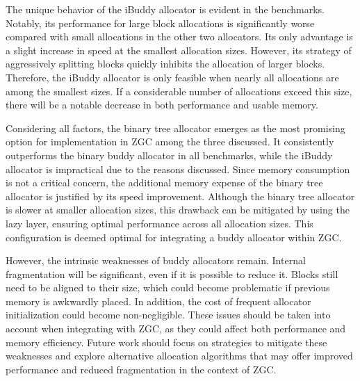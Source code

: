 \newpage
The unique behavior of the iBuddy allocator is evident in the benchmarks. Notably, its performance for large block allocations is significantly worse compared with small allocations in the other two allocators. Its only advantage is a slight increase in speed at the smallest allocation sizes. However, its strategy of aggressively splitting blocks quickly inhibits the allocation of larger blocks. Therefore, the iBuddy allocator is only feasible when nearly all allocations are among the smallest sizes. If a considerable number of allocations exceed this size, there will be a notable decrease in both performance and usable memory.

Considering all factors, the binary tree allocator emerges as the most promising option for implementation in ZGC among the three discussed. It consistently outperforms the binary buddy allocator in all benchmarks, while the iBuddy allocator is impractical due to the reasons discussed. Since memory consumption is not a critical concern, the additional memory expense of the binary tree allocator is justified by its speed improvement. Although the binary tree allocator is slower at smaller allocation sizes, this drawback can be mitigated by using the lazy layer, ensuring optimal performance across all allocation sizes. This configuration is deemed optimal for integrating a buddy allocator within ZGC.

However, the intrinsic weaknesses of buddy allocators remain. Internal fragmentation will be significant, even if it is possible to reduce it. Blocks still need to be aligned to their size, which could become problematic if previous memory is awkwardly placed. In addition, the cost of frequent allocator initialization could become non-negligible. These issues should be taken into account when integrating with ZGC, as they could affect both performance and memory efficiency. Future work should focus on strategies to mitigate these weaknesses and explore alternative allocation algorithms that may offer improved performance and reduced fragmentation in the context of ZGC.

